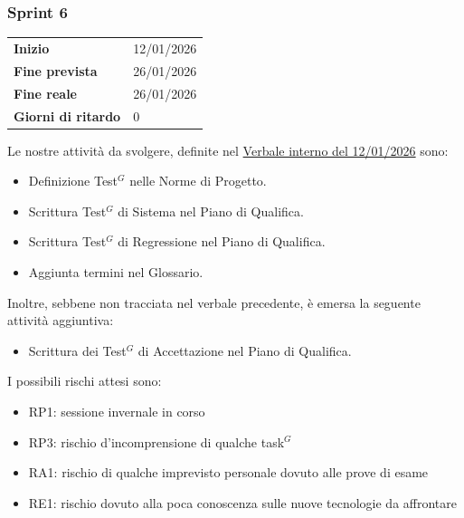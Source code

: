 \subsubsection{Sprint 6}


\begin{tabular}{p{} p{}}
	\textbf{Inizio} & 12/01/2026 \\
	\textbf{Fine prevista} & 26/01/2026 \\
	\textbf{Fine reale} &  26/01/2026 \\
	\textbf{Giorni di ritardo} & 0
\end{tabular}
\newline \newline 
Le nostre attività da svolgere, definite nel \href{https://nullpointersgroup.github.io/Documentazione/output/RTB/Verbali%20Interni/2026-01-12_verbale_interno.pdf}{Verbale interno del 12/01/2026} sono:
\begin{itemize}[itemsep=5pt, parsep=1pt, label=$\scriptstyle\bullet$]
    \item Definizione Test$^G$ nelle Norme di Progetto.
    \item Scrittura Test$^G$ di Sistema nel Piano di Qualifica.
    \item Scrittura Test$^G$ di Regressione nel Piano di Qualifica.
    \item Aggiunta termini nel Glossario.
\end{itemize}
Inoltre, sebbene non tracciata nel verbale precedente, è emersa la seguente attività aggiuntiva:
\begin{itemize}
	\item Scrittura dei Test$^G$ di Accettazione nel Piano di Qualifica.
\end{itemize}

I possibili rischi attesi sono:
\begin{itemize}[itemsep=5pt, parsep=1pt, label=$\scriptstyle\bullet$]
	\item RP1: sessione invernale in corso 
	\item RP3: rischio d'incomprensione di qualche task$^G$
	\item RA1: rischio di qualche imprevisto personale dovuto alle prove di esame
	\item RE1: rischio dovuto alla poca conoscenza sulle nuove tecnologie da affrontare
\end{itemize}

